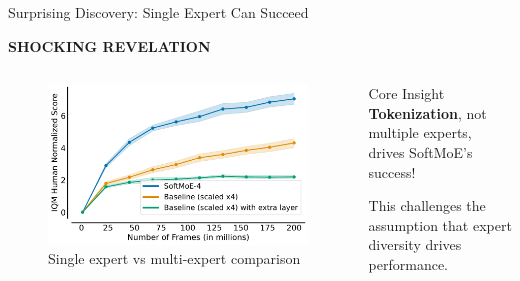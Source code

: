 \documentclass{beamer}
\begin{document}
\begin{frame}{Surprising Discovery: Single Expert Can Succeed}
  \begin{center}
    \Large \colorbox{red!20}{\textbf{SHOCKING REVELATION}}
  \end{center}
  
  \begin{columns}[T]
    \begin{column}{0.6\textwidth}
      \begin{figure}
        \centering
        \includegraphics[width=\textwidth]{Don_t_flatten_tokenize/figures/results/SoftMoE-x4_vs_Baseline_w_extralayer.pdf}
        \caption{Single expert vs multi-expert comparison}
      \end{figure}
    \end{column}
    \begin{column}{0.4\textwidth}
      \begin{block}{Core Insight}
        \textbf{Tokenization}, not multiple experts, drives SoftMoE's success!
        
        \vspace{0.5em}
        This challenges the assumption that expert diversity drives performance.
      \end{block}
    \end{column}
  \end{columns}
\end{frame}
\end{document}
